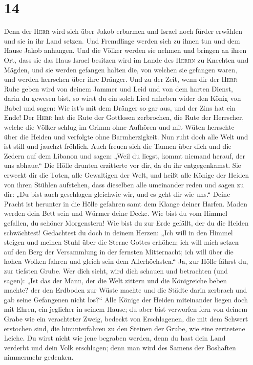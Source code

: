 \hypertarget{section-13}{%
\section{14}\label{section-13}}

 Denn der \textsc{Herr} wird sich über Jakob erbarmen und
Israel noch fürder erwählen und sie in ihr Land setzen. Und Fremdlinge
werden sich zu ihnen tun und dem Hause Jakob anhangen. 
Und die Völker werden sie nehmen und bringen an ihren Ort, dass sie das
Haus Israel besitzen wird im Lande des \textsc{Herrn} zu Knechten und
Mägden, und sie werden gefangen halten die, von welchen sie gefangen
waren, und werden herrschen über ihre Dränger.  Und zu der
Zeit, wenn dir der \textsc{Herr} Ruhe geben wird von deinem Jammer und
Leid und von dem harten Dienst, darin du gewesen bist,  so
wirst du ein solch Lied anheben wider den König von Babel und sagen: Wie
ist's mit dem Dränger so gar aus, und der Zins hat ein Ende!
 Der \textsc{Herr} hat die Rute der Gottlosen zerbrochen,
die Rute der Herrscher,  welche die Völker schlug im Grimm
ohne Aufhören und mit Wüten herrschte über die Heiden und verfolgte ohne
Barmherzigkeit.  Nun ruht doch alle Welt und ist still und
jauchzt fröhlich.  Auch freuen sich die Tannen über dich
und die Zedern auf dem Libanon und sagen: „Weil du liegst, kommt niemand
herauf, der uns abhaue.``  Die Hölle drunten erzitterte
vor dir, da du ihr entgegenkamst. Sie erweckt dir die Toten, alle
Gewaltigen der Welt, und heißt alle Könige der Heiden von ihren Stühlen
aufstehen,  dass dieselben alle umeinander reden und
sagen zu dir: „Du bist auch geschlagen gleichwie wir, und es geht dir
wie uns.``  Deine Pracht ist herunter in die Hölle
gefahren samt dem Klange deiner Harfen. Maden werden dein Bett sein und
Würmer deine Decke.  Wie bist du vom Himmel gefallen, du
schöner Morgenstern! Wie bist du zur Erde gefällt, der du die Heiden
schwächtest!  Gedachtest du doch in deinem Herzen: „Ich
will in den Himmel steigen und meinen Stuhl über die Sterne Gottes
erhöhen;  ich will mich setzen auf den Berg der
Versammlung in der fernsten Mitternacht; ich will über die hohen Wolken
fahren und gleich sein dem Allerhöchsten.``  Ja, zur
Hölle fährst du, zur tiefsten Grube.  Wer dich sieht,
wird dich schauen und betrachten (und sagen): „Ist das der Mann, der die
Welt zittern und die Königreiche beben machte?  der den
Erdboden zur Wüste machte und die Städte darin zerbrach und gab seine
Gefangenen nicht los?{}``  Alle Könige der Heiden
miteinander liegen doch mit Ehren, ein jeglicher in seinem Hause;
 du aber bist verworfen fern von deinem Grabe wie ein
verachteter Zweig, bedeckt von Erschlagenen, die mit dem Schwert
erstochen sind, die hinunterfahren zu den Steinen der Grube, wie eine
zertretene Leiche.  Du wirst nicht wie jene begraben
werden, denn du hast dein Land verderbt und dein Volk erschlagen; denn
man wird des Samens der Boshaften nimmermehr gedenken.

